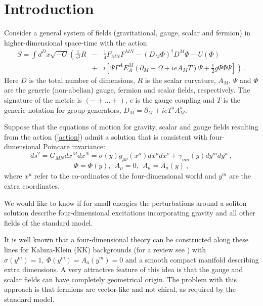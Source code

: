 \documentclass[a4paper,12pt]{article}
\begin{document}
\eject
\pagestyle{empty}
\setcounter{page}{1}
\setcounter{footnote}{0}
\pagestyle{plain}


\section{Introduction}
Consider a general system of fields (gravitational, gauge, scalar and
fermion) in higher-dimensional space-time with the action
\begin{eqnarray}
S = \int d^D x \sqrt{-G}\left(\frac{1}{\kappa^2} R \right.& - &
\frac{1}{4} F_{MN} F^{MN} -(D_M\Phi)^\dagger D^M\Phi
-U(\Phi)
\label{action}
\\
  &+&\left. i[\bar \Psi \Gamma^A E_A ^M (\partial_M - \Omega +
ie A_M T)\Psi + \frac{1}{2} g \bar\Psi \Phi  \Psi] \right)~.
\nonumber
\end{eqnarray}
Here $D$ is the total number of dimensions, $R$ is the scalar
curvature,  $A_M$, $\Psi$ and $\Phi$ are the generic (non-abelian)
gauge, fermion and scalar fields, respectively. The signature of the
metric is $(-+\ldots +)$, $e$ is the gauge coupling and $T$ is the
generic notation for group generators, $D_M=\partial_M+i e T^a A_M^a$.

Suppose that the equations of motion for gravity, scalar and gauge
fields resulting from the action (\ref{action}) admit a solution that
is consistent with four-dimensional  Poincare invariance:
\begin{equation}
ds^2 = G_{MN}dx^M dx^N=\sigma(y)g_{\mu\nu}(x^\mu)dx^\mu dx^\nu +
\gamma_{mn}(y)dy^mdy^n~, \label{conf}
\end{equation}
\begin{equation}
 \Phi = \Phi(y),~~A_\mu=0,~~A_a=A_a(y)~,
\label{field}
\end{equation}
where $x^\mu$ refer to the co-ordinates of the four-dimensional world
and $y^m$ are the extra coordinates.

We would like to know if for small energies the perturbations around
a soliton solution describe four-dimensional excitations
incorporating gravity and all other fields of the standard model.

It is well known that a four-dimensional theory can be constructed
along these lines for Kaluza-Klein (KK) backgrounds (for a review see
\cite{kk}) with $\sigma(y^m)=1,~ \Phi(y^m) = A_a(y^m) = 0$ and a
smooth compact manifold describing extra dimensions. A very
attractive feature of this idea is that the gauge and scalar fields
can have completely geometrical origin.  The problem with this
approach is that fermions are vector-like \cite{Witten:1983ux} and
not chiral, as required by the standard model.
\end{document}
